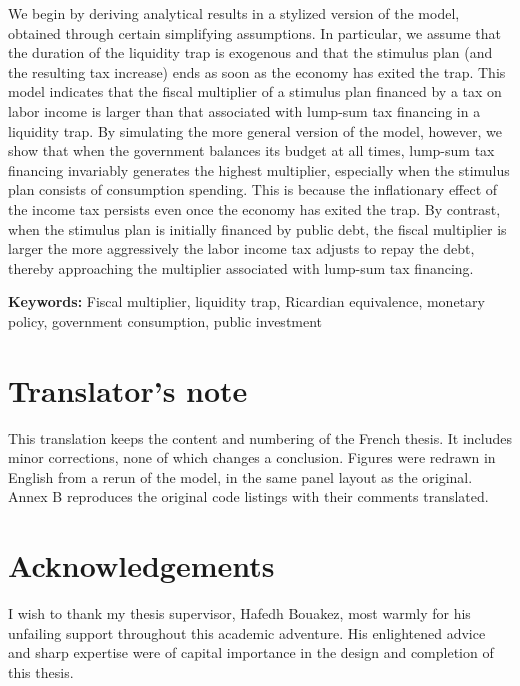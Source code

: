 \documentclass[12pt,letterpaper]{article}
\begin{document}
We begin by deriving analytical results in a stylized version of the model, obtained through certain simplifying assumptions. In particular, we assume that the duration of the liquidity trap is exogenous and that the stimulus plan (and the resulting tax increase) ends as soon as the economy has exited the trap. This model indicates that the fiscal multiplier of a stimulus plan financed by a tax on labor income is larger than that associated with lump-sum tax financing in a liquidity trap. By simulating the more general version of the model, however, we show that when the government balances its budget at all times, lump-sum tax financing invariably generates the highest multiplier, especially when the stimulus plan consists of consumption spending. This is because the inflationary effect of the income tax persists even once the economy has exited the trap. By contrast, when the stimulus plan is initially financed by public debt, the fiscal multiplier is larger the more aggressively the labor income tax adjusts to repay the debt, thereby approaching the multiplier associated with lump-sum tax financing.

\medskip
\noindent\textbf{Keywords:} Fiscal multiplier, liquidity trap, Ricardian equivalence, monetary policy, government consumption, public investment

\newpage
\tableofcontents
\newpage
\listoftables
\listoffigures

\section*{Translator's note}

This translation keeps the content and numbering of the French thesis. It includes minor corrections, none of which changes a conclusion. Figures were redrawn in English from a rerun of the model, in the same panel layout as the original. Annex B reproduces the original code listings with their comments translated.

\section*{Acknowledgements}

I wish to thank my thesis supervisor, Hafedh Bouakez, most warmly for his unfailing support throughout this academic adventure. His enlightened advice and sharp expertise were of capital importance in the design and completion of this thesis.
\end{document}
